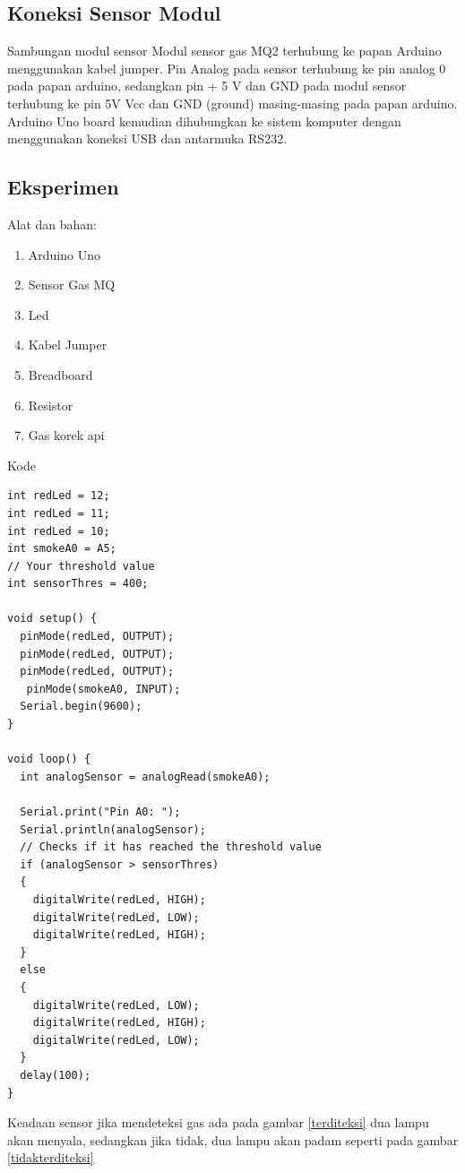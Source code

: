 \subsection{Koneksi Sensor Modul}
Sambungan modul sensor Modul sensor gas MQ2 terhubung ke papan Arduino menggunakan kabel jumper. Pin Analog pada sensor terhubung ke pin analog 0 pada papan arduino, sedangkan pin + 5 V dan GND pada modul sensor terhubung ke pin 5V Vcc dan GND (ground) masing-masing pada papan arduino. Arduino Uno board kemudian dihubungkan ke sistem komputer dengan menggunakan koneksi USB dan antarmuka RS232.

\subsection{Eksperimen}
Alat dan bahan:
\begin{enumerate}
\item Arduino Uno
\item Sensor Gas MQ
\item Led
\item Kabel Jumper
\item Breadboard
\item Resistor
\item Gas korek api
\end{enumerate}
Kode
\begin{verbatim}
int redLed = 12;
int redLed = 11;
int redLed = 10;
int smokeA0 = A5;
// Your threshold value
int sensorThres = 400;

void setup() {
  pinMode(redLed, OUTPUT);
  pinMode(redLed, OUTPUT);
  pinMode(redLed, OUTPUT);
   pinMode(smokeA0, INPUT);
  Serial.begin(9600);
}

void loop() {
  int analogSensor = analogRead(smokeA0);

  Serial.print("Pin A0: ");
  Serial.println(analogSensor);
  // Checks if it has reached the threshold value
  if (analogSensor > sensorThres)
  {
    digitalWrite(redLed, HIGH);
    digitalWrite(redLed, LOW);
    digitalWrite(redLed, HIGH);
  }
  else
  {
    digitalWrite(redLed, LOW);
    digitalWrite(redLed, HIGH);
    digitalWrite(redLed, LOW);
  }
  delay(100);
}
\end{verbatim}

Keadaan sensor jika mendeteksi gas ada pada gambar \ref{terditeksi} dua lampu akan menyala, sedangkan jika tidak, dua lampu akan padam seperti pada gambar \ref{tidakterditeksi}

